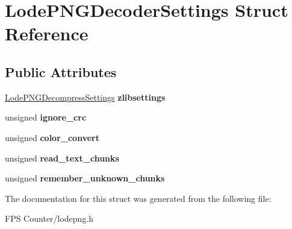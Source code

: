 \hypertarget{struct_lode_p_n_g_decoder_settings}{}\section{Lode\+P\+N\+G\+Decoder\+Settings Struct Reference}
\label{struct_lode_p_n_g_decoder_settings}
\subsection*{Public Attributes}
\begin{DoxyCompactItemize}
\item 
\mbox{\label{struct_lode_p_n_g_decoder_settings_a9ae8fef9880bef97a3e932f8ea942ed8}} 
\mbox{\hyperlink{struct_lode_p_n_g_decompress_settings}{Lode\+P\+N\+G\+Decompress\+Settings}} {\bfseries zlibsettings}
\item 
\mbox{\label{struct_lode_p_n_g_decoder_settings_a6390c403d2a5718242337bbbaf15131d}} 
unsigned {\bfseries ignore\+\_\+crc}
\item 
\mbox{\label{struct_lode_p_n_g_decoder_settings_af26f2b29cd338ce4476bee9571a0818a}} 
unsigned {\bfseries color\+\_\+convert}
\item 
\mbox{\label{struct_lode_p_n_g_decoder_settings_aa1212905c3f73d9fffef2c04a220d951}} 
unsigned {\bfseries read\+\_\+text\+\_\+chunks}
\item 
\mbox{\label{struct_lode_p_n_g_decoder_settings_a8775e4fc539dc457916720f52b442f27}} 
unsigned {\bfseries remember\+\_\+unknown\+\_\+chunks}
\end{DoxyCompactItemize}


The documentation for this struct was generated from the following file\+:\begin{DoxyCompactItemize}
\item 
F\+P\+S Counter/lodepng.\+h\end{DoxyCompactItemize}
